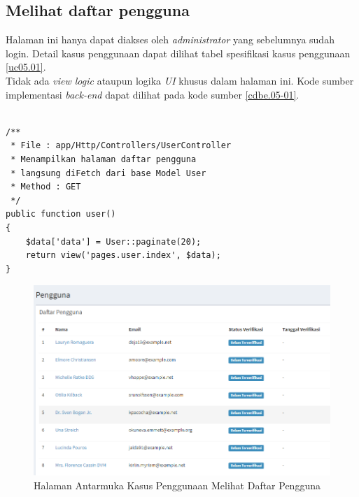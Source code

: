 \subsection{Melihat daftar pengguna}
Halaman ini hanya dapat diakses oleh \textit{administrator} yang sebelumnya sudah login. Detail kasus penggunaan dapat dilihat tabel spesifikasi kasus penggunaan \ref{uc05.01}.\\
\indent Tidak ada \textit{view logic} ataupun logika \textit{UI} khusus dalam halaman ini. Kode sumber implementasi \textit{back-end} dapat dilihat pada kode sumber \ref{cdbe.05-01}.

\begin{lstlisting}[label=cdbe.05-01,style=php,caption=Kode Sumber Antarmuka Registrasi]

/** 
 * File : app/Http/Controllers/UserController
 * Menampilkan halaman daftar pengguna
 * langsung diFetch dari base Model User
 * Method : GET
 */
public function user()
{
    $data['data'] = User::paginate(20);
    return view('pages.user.index', $data);
}
\end{lstlisting}
      
  \begin{figure}[H]
    \centering
    \includegraphics[width=\textwidth]{images/bab4/ui/05-01.png}
    \caption{Halaman Antarmuka Kasus Penggunaan Melihat Daftar Pengguna}
    \label{ui.05-01}
  \end{figure}
      
